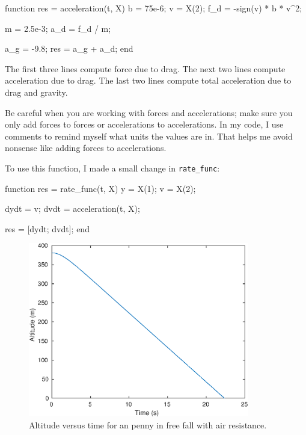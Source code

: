 \documentclass[
]{book}
\numberwithin{Answer}{chapter}
\numberwithin{Exercise}{chapter}
\begin{document}
\begin{code}
function res = acceleration(t, X)
    b = 75e-6;                %
    v = X(2);                 %
    f_d = -sign(v) * b * v^2; %

    m = 2.5e-3;               %
    a_d = f_d / m;            %

    a_g = -9.8;               %
    res = a_g + a_d;          %
end
\end{code}

The first three lines compute force due to drag.
The next two lines compute acceleration due to drag.
The last two lines compute total acceleration due to drag and gravity.


Be careful when you are working with forces and accelerations; make sure
you only add forces to forces or accelerations to accelerations.  In my
code, I use comments to remind myself what units the values are in.
That helps me avoid nonsense like adding forces to accelerations.

To use this function, I made a small change in \verb"rate_func":

\begin{code}
function res = rate_func(t, X)
    y = X(1);      
    v = X(2);      
    
    dydt = v;
    dvdt = acceleration(t, X);   %

    res = [dydt; dvdt];
end

\end{code}

\begin{figure}
\centerline{\includegraphics[height=3in]{book/figs/penny2.eps}}
\caption{Altitude versus time for an penny in free fall with air resistance.}
\label{fig:penny2}
\end{figure}
\end{document}
